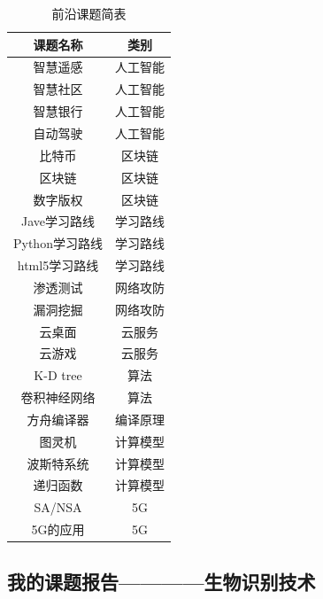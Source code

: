 \documentclass{article}
\renewcommand{\captionfont}{\small}
\begin{document}
\begin{table}[h]
    \centering
    \captionfont
    \caption{前沿课题简表}
\begin{tabular}{|c|c|}
    \hline
    课题名称 & 类别\\
    \hline
    智慧遥感 & 人工智能 \\\hline
    智慧社区 & 人工智能\\	\hline
    智慧银行 & 人工智能\\	\hline
    自动驾驶 & 人工智能\\	\hline
    比特币	& 区块链\\	\hline
    区块链	& 区块链\\	\hline
    数字版权 & 区块链\\	\hline
    Jave学习路线 & 学习路线\\	\hline
    Python学习路线 & 学习路线\\	\hline
    html5学习路线 & 学习路线\\	\hline
    渗透测试	& 网络攻防\\	\hline
    漏洞挖掘	& 网络攻防\\	\hline
    云桌面 & 云服务\\	\hline
    云游戏 & 云服务\\	\hline
    K-D tree & 算法\\	\hline
    卷积神经网络	& 算法\\	\hline
    方舟编译器	& 编译原理\\	\hline
    图灵机	&	计算模型	\\ \hline
    波斯特系统	& 计算模型\\ \hline
    递归函数	&	计算模型\\	\hline
    SA/NSA	&	5G\\ \hline
    5G的应用 &	5G\\	\hline
\end{tabular}
    \label{table1}
\end{table}
\subsection{我的课题报告————生物识别技术}
\end{document}
